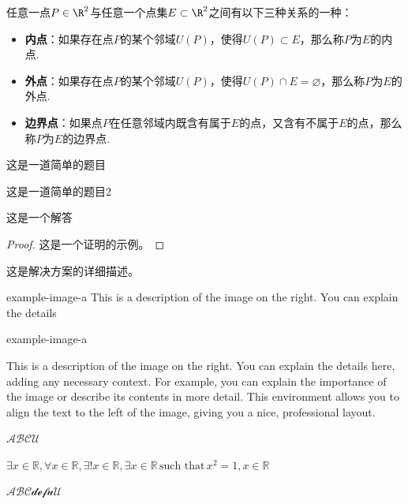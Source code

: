 \documentclass[12pt, a4paper, oneside, UTF8]{ctexbook}
\begin{document}
	
	任意一点$P \in \R^2$与任意一个点集$E \subset \R^2$之间有以下三种关系的一种：
	\begin{itemize}[leftmargin=45pt]
		\item \textbf{内点}：如果存在点$P$的某个邻域$U(P)$，使得$U(P) \subset E$，那么称$P$为$E$的内点.
		\item \textbf{外点}：如果存在点$P$的某个邻域$U(P)$，使得$U(P) \cap E = \varnothing$，那么称$P$为$E$的外点.
		\item \textbf{边界点}：如果点$P$在任意邻域内既含有属于$E$的点，又含有不属于$E$的点，那么称$P$为$E$的边界点.
	\end{itemize}
	
	\begin{problem}
		这是一道简单的题目
	\end{problem}
	
	\begin{problem}
		这是一道简单的题目2
	\end{problem}
	\begin{answer}
		这是一个解答
	\end{answer}
	
	\begin{proof}
		这是一个证明的示例。
	\end{proof}
	
	\begin{solution}
		这是解决方案的详细描述。
	\end{solution}

	\begin{leftimage}[0.2\textwidth]{example-image-a}
	This is a description of the image on the right. You can explain the details 
\end{leftimage}

\begin{leftthreeimage}[0.45\textwidth]{example-image-a}
	\caption{\color{red} left image t}  %
	\label{fig:leftimage1}  %
	This is a description of the image on the right. You can explain the details here, adding any necessary context. For example, you can explain the importance of the image or describe its contents in more detail. This environment allows you to align the text to the left of the image, giving you a nice, professional layout.
\end{leftthreeimage}
$\mathcal{A B C U}$ 

$	\exists x \in \mathbb{R} ,\forall x \in \mathbb{R},\exists! x \in \mathbb{R},\exists x \in \mathbb{R} \, \text{such that} \, x^2 = 1,x \in \mathbb{R}$

$\mathscr{ABCdef u U}$
	\ifx\allfiles\undefined
\end{document}
